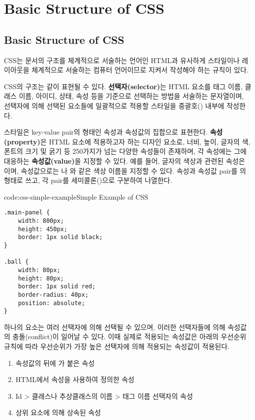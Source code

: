 \section{Basic Structure of CSS}\label{sect:basic-structure-of-css}

\subsection*{Basic Structure of CSS}

CSS는 문서의 구조를 체계적으로 서술하는 언어인 HTML과 유사하게 스타일이나 레이아웃을 체계적으로 서술하는 컴퓨터 언어이므로 지켜서 작성해야 하는 규칙이 있다.

    {}

CSS의 구조는 \와 같이 표현될 수 있다. \textbf{선택자(selector)}는 HTML 요소를 태그 이름, 클래스 이름, 아이디, 상태, 속성 등을 기준으로 선택하는 방법을 서술하는 문자열이며, 선택자에 의해 선택된 요소들에 일괄적으로 적용할 스타일을 중괄호(\cd{\{\}}) 내부에 작성한다.

스타일은 key-value pair의 형태인 속성과 속성값의 집합으로 표현한다. \textbf{속성(property)}은 HTML 요소에 적용하고자 하는 디자인 요소로, 너비, 높이, 글자의 색, 폰트의 크기 및 굵기 등 250가지가 넘는 다양한 속성들이 존재하며, 각 속성에는 그에 대응하는 \textbf{속성값(value)}을 지정할 수 있다. 예를 들어, 글자의 색상과 관련된 속성은 이며, 속성값으로는 나 와 같은 색상 이름을 지정할 수 있다. 속성과 속성값 pair를 의 형태로 쓰고, 각 pair를 세미콜론(\cd{;})으로 구분하여 나열한다.

\begin{codeenv}{code:css-simple-example}{Simple Example of CSS}\begin{verbatim}
.main-panel {
    width: 800px;
    height: 450px;
    border: 1px solid black;
}

.ball {
    width: 80px;
    height: 80px;
    border: 1px solid red;
    border-radius: 40px;
    position: absolute;
}
\end{verbatim}
\end{codeenv}

하나의 요소는 여러 선택자에 의해 선택될 수 있으며, 이러한 선택자들에 의해 속성값의 충돌(conflict)이 일어날 수 있다. 이때 실제로 적용되는 속성값은 아래의 우선순위 규칙에 따라 우선순위가 가장 높은 선택자에 의해 적용되는 속성값이 적용된다.

\begin{enumerate}
    \item 속성값의 뒤에 가 붙은 속성
    \item HTML에서  속성을 사용하여 정의한 속성
    \item Id {\textgreater} 클래스나 추상클래스의 이름 {\textgreater} 태그 이름 선택자의 속성
    \item 상위 요소에 의해 상속된 속성
\end{enumerate}

